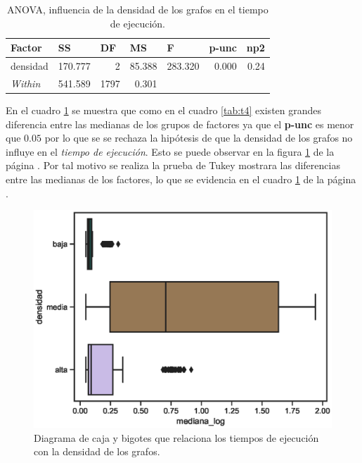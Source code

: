 \documentclass{article}
\begin{document}
\begin{table}[htbp]
  \centering
  \caption{ANOVA, influencia de la densidad de los grafos en el tiempo de ejecución.}
    \begin{tabular}{lrrrlll}
    \toprule
    \textbf{Factor} & \multicolumn{1}{l}{\textbf{SS}} & \multicolumn{1}{l}{\textbf{DF}} & \multicolumn{1}{l}{\textbf{MS}} & \textbf{F} & \textbf{p-unc} & \textbf{np2} \\
    \midrule
    densidad & 170.777 & 2     & 85.388 & \multicolumn{1}{r}{283.320} & \multicolumn{1}{r}{0.000} & \multicolumn{1}{r}{0.24} \\
    \textit{Within} & 541.589 & 1797  & 0.301 &      &      &  \\
    \bottomrule
    \end{tabular}%
  \label{tab:t6}%
\end{table}%
En el cuadro \ref{tab:t6} se muestra que como en el cuadro \ref{tab:t4} existen grandes diferencia entre las medianas de los grupos de factores ya que el \textbf{p-unc} es menor que $0.05$ por lo que se se rechaza la hipótesis de que la densidad de los grafos no influye en el \textit{tiempo de ejecución}. Esto se puede observar en la figura \ref{fig8} de la página \pageref{fig8}. Por tal motivo se realiza la prueba de Tukey mostrara las diferencias entre las medianas de los factores, lo que se evidencia en el cuadro \ref{tab:t6} de la página \pageref{tab:t6}. 
\begin{center}
\begin{figure}[htbp]
\includegraphics[scale=0.6]{boxplotdensidad.eps}
\caption{Diagrama de caja y bigotes que relaciona los tiempos de ejecución con la densidad de los grafos.}
\label{fig8}
\end{figure}
\end{center}
\end{document}
